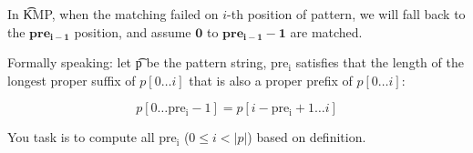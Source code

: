 In \t{KMP}, when the matching failed on $i$-th position of pattern, we will fall back to the $\mathbf{pre_{i-1}}$ position, 
   and assume $\mathbf{0}$ to $\mathbf{pre_{i-1}-1}$ are matched.

Formally speaking: let \t{p} be the pattern string,
$\mathrm{pre_i}$ satisfies that the length of the longest proper suffix of $p[0 \dots i]$ that is also a proper prefix of $p[0 \ldots i]$:

\[
 p[0 \ldots \mathrm{pre_i}-1] = p[i- \mathrm{pre_i}+1 \ldots i]
\]

You task is to compute all $\mathrm{pre_i}$ ($0\le i < |p|$) based on definition.
